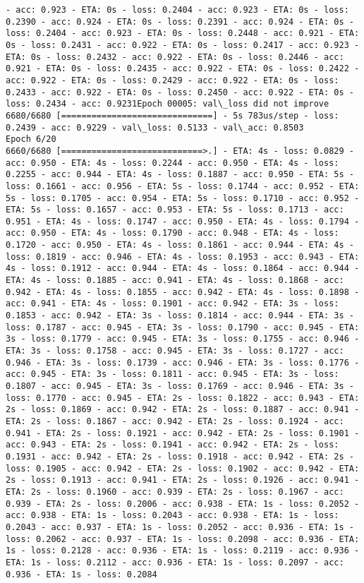 \documentclass[11pt]{article}
\begin{document}
\begin{Verbatim}[commandchars=\\\{\}]
- acc: 0.923 - ETA: 0s - loss: 0.2404 - acc: 0.923 - ETA: 0s - loss: 0.2390 - acc: 0.924 - ETA: 0s - loss: 0.2391 - acc: 0.924 - ETA: 0s - loss: 0.2404 - acc: 0.923 - ETA: 0s - loss: 0.2448 - acc: 0.921 - ETA: 0s - loss: 0.2431 - acc: 0.922 - ETA: 0s - loss: 0.2417 - acc: 0.923 - ETA: 0s - loss: 0.2432 - acc: 0.922 - ETA: 0s - loss: 0.2446 - acc: 0.921 - ETA: 0s - loss: 0.2435 - acc: 0.922 - ETA: 0s - loss: 0.2422 - acc: 0.922 - ETA: 0s - loss: 0.2429 - acc: 0.922 - ETA: 0s - loss: 0.2433 - acc: 0.922 - ETA: 0s - loss: 0.2450 - acc: 0.922 - ETA: 0s - loss: 0.2434 - acc: 0.9231Epoch 00005: val\_loss did not improve
6680/6680 [==============================] - 5s 783us/step - loss: 0.2439 - acc: 0.9229 - val\_loss: 0.5133 - val\_acc: 0.8503
Epoch 6/20
6660/6680 [============================>.] - ETA: 4s - loss: 0.0829 - acc: 0.950 - ETA: 4s - loss: 0.2244 - acc: 0.950 - ETA: 4s - loss: 0.2255 - acc: 0.944 - ETA: 4s - loss: 0.1887 - acc: 0.950 - ETA: 5s - loss: 0.1661 - acc: 0.956 - ETA: 5s - loss: 0.1744 - acc: 0.952 - ETA: 5s - loss: 0.1705 - acc: 0.954 - ETA: 5s - loss: 0.1710 - acc: 0.952 - ETA: 5s - loss: 0.1657 - acc: 0.953 - ETA: 5s - loss: 0.1713 - acc: 0.951 - ETA: 4s - loss: 0.1747 - acc: 0.950 - ETA: 4s - loss: 0.1794 - acc: 0.950 - ETA: 4s - loss: 0.1790 - acc: 0.948 - ETA: 4s - loss: 0.1720 - acc: 0.950 - ETA: 4s - loss: 0.1861 - acc: 0.944 - ETA: 4s - loss: 0.1819 - acc: 0.946 - ETA: 4s - loss: 0.1953 - acc: 0.943 - ETA: 4s - loss: 0.1912 - acc: 0.944 - ETA: 4s - loss: 0.1864 - acc: 0.944 - ETA: 4s - loss: 0.1885 - acc: 0.941 - ETA: 4s - loss: 0.1868 - acc: 0.942 - ETA: 4s - loss: 0.1855 - acc: 0.942 - ETA: 4s - loss: 0.1898 - acc: 0.941 - ETA: 4s - loss: 0.1901 - acc: 0.942 - ETA: 3s - loss: 0.1853 - acc: 0.942 - ETA: 3s - loss: 0.1814 - acc: 0.944 - ETA: 3s - loss: 0.1787 - acc: 0.945 - ETA: 3s - loss: 0.1790 - acc: 0.945 - ETA: 3s - loss: 0.1779 - acc: 0.945 - ETA: 3s - loss: 0.1755 - acc: 0.946 - ETA: 3s - loss: 0.1758 - acc: 0.945 - ETA: 3s - loss: 0.1727 - acc: 0.946 - ETA: 3s - loss: 0.1739 - acc: 0.946 - ETA: 3s - loss: 0.1776 - acc: 0.945 - ETA: 3s - loss: 0.1811 - acc: 0.945 - ETA: 3s - loss: 0.1807 - acc: 0.945 - ETA: 3s - loss: 0.1769 - acc: 0.946 - ETA: 3s - loss: 0.1770 - acc: 0.945 - ETA: 2s - loss: 0.1822 - acc: 0.943 - ETA: 2s - loss: 0.1869 - acc: 0.942 - ETA: 2s - loss: 0.1887 - acc: 0.941 - ETA: 2s - loss: 0.1867 - acc: 0.942 - ETA: 2s - loss: 0.1924 - acc: 0.941 - ETA: 2s - loss: 0.1921 - acc: 0.942 - ETA: 2s - loss: 0.1901 - acc: 0.943 - ETA: 2s - loss: 0.1941 - acc: 0.942 - ETA: 2s - loss: 0.1931 - acc: 0.942 - ETA: 2s - loss: 0.1918 - acc: 0.942 - ETA: 2s - loss: 0.1905 - acc: 0.942 - ETA: 2s - loss: 0.1902 - acc: 0.942 - ETA: 2s - loss: 0.1913 - acc: 0.941 - ETA: 2s - loss: 0.1926 - acc: 0.941 - ETA: 2s - loss: 0.1960 - acc: 0.939 - ETA: 2s - loss: 0.1967 - acc: 0.939 - ETA: 2s - loss: 0.2006 - acc: 0.938 - ETA: 1s - loss: 0.2052 - acc: 0.938 - ETA: 1s - loss: 0.2043 - acc: 0.938 - ETA: 1s - loss: 0.2043 - acc: 0.937 - ETA: 1s - loss: 0.2052 - acc: 0.936 - ETA: 1s - loss: 0.2062 - acc: 0.937 - ETA: 1s - loss: 0.2098 - acc: 0.936 - ETA: 1s - loss: 0.2128 - acc: 0.936 - ETA: 1s - loss: 0.2119 - acc: 0.936 - ETA: 1s - loss: 0.2112 - acc: 0.936 - ETA: 1s - loss: 0.2097 - acc: 0.936 - ETA: 1s - loss: 0.2084 
\end{Verbatim}
\end{document}
